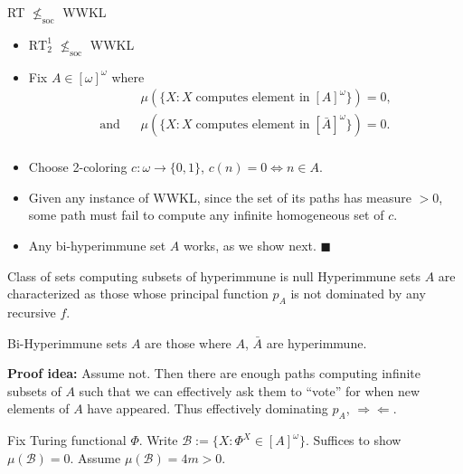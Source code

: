 \begin{frame}{RT $\nleq_{\text{soc}}$ WWKL}
  \begin{itemize}
    \item $\text{RT}_2^1$ $\nleq_{\text{soc}}$ WWKL
    \item Fix $A\in[\omega]^\omega$ where
      \begin{align*}
        &\mu(\{X: X\; \text{computes element in}\; [A]^\omega\}) =0,\\
        \text{and}\;\;\; &\mu(\{X: X\; \text{computes element in}\;
        [\bar{A}]^\omega\}) =0.\\
      \end{align*}
    \item Choose 2-coloring $c:\omega\rightarrow\{0,1\}$, $c(n)=0
      \Leftrightarrow n\in A$.
    \item Given any instance of WWKL, since the set of its paths has
      measure $>0$, some path must fail to compute any infinite
      homogeneous set of $c$. 
    \item Any bi-hyperimmune set $A$ works, as we show next.
    $\blacksquare$
  \end{itemize}
\end{frame}

\begin{frame}{Class of sets computing subsets of hyperimmune is null}
  Hyperimmune sets $A$ are characterized as those whose principal
  function $p_A$ is not dominated by any recursive $f$. \\
  \vspace{1em}

  Bi-Hyperimmune sets $A$ are those where $A$, $\bar{A}$ are hyperimmune.\\
  \vspace{1em}

  \textbf{Proof idea:} Assume not. Then there are enough paths computing
  infinite subsets of $A$ such that we can effectively ask them to ``vote''
  for when new elements of $A$ have appeared. Thus effectively dominating
  $p_A$, $\Rightarrow\Leftarrow$.\\
  \vspace{1em}

  Fix Turing functional $\Phi$. Write $\mathcal{B} :=\{X:
  \Phi^X\in[A]^\omega\}$. Suffices to show $\mu(\mathcal{B})=0$. Assume
  $\mu(\mathcal{B})=4m>0$.
\end{frame}

